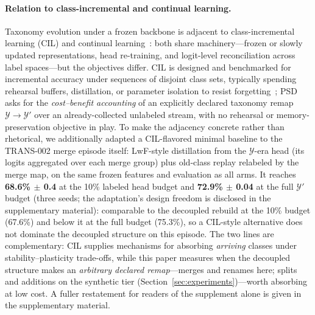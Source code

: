 \paragraph{Relation to class-incremental and continual learning.}
Taxonomy evolution under a frozen backbone is adjacent to class-incremental learning (CIL) and continual learning~\citep{rebuffi2017icarl,wang2024continual,masana2023cil}: both share machinery---frozen or slowly updated representations, head re-training, and logit-level reconciliation across label spaces---but the objectives differ. CIL is designed and benchmarked for incremental accuracy under sequences of disjoint class sets, typically spending rehearsal buffers, distillation, or parameter isolation to resist forgetting~\citep{rebuffi2017icarl,masana2023cil}; PSD asks for the \emph{cost--benefit accounting} of an explicitly declared taxonomy remap $\mathcal{Y}\to\mathcal{Y}'$ over an already-collected unlabeled stream, with no rehearsal or memory-preservation objective in play. To make the adjacency concrete rather than rhetorical, we additionally adapted a CIL-flavored minimal baseline to the TRANS-002 merge episode itself: LwF-style distillation from the $\mathcal{Y}$-era head (its logits aggregated over each merge group) plus old-class replay relabeled by the merge map, on the same frozen features and evaluation as all arms. It reaches \textbf{68.6\% $\pm$ 0.4} at the 10\% labeled head budget and \textbf{72.9\% $\pm$ 0.04} at the full $\mathcal{Y}'$ budget (three seeds; the adaptation's design freedom is disclosed in the supplementary material): comparable to the decoupled rebuild at the 10\% budget (67.6\%) and below it at the full budget (75.3\%), so a CIL-style alternative does not dominate the decoupled structure on this episode. The two lines are complementary: CIL supplies mechanisms for absorbing \emph{arriving} classes under stability--plasticity trade-offs, while this paper measures when the decoupled structure makes an \emph{arbitrary declared remap}---merges and renames here; splits and additions on the synthetic tier (Section~\ref{sec:experiments})---worth absorbing at low cost. A fuller restatement for readers of the supplement alone is given in the supplementary material.


